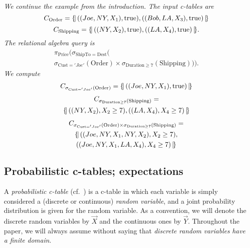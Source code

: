 \begin{example}\em
We continue the example from the introduction. The input c-tables are
\[
C_{\mathrm{Order}} = \{\!|\, ((Joe, NY, X_1), \mbox{true}),
((Bob, LA, X_3), \mbox{true}) \,|\!\}
\]
\[
C_{\mathrm{Shipping}} = \{\!|\, ((NY, X_2), \mbox{true}),
   ((LA, X_4), \mbox{true}) \,|\!\}.
\]
The relational algebra query is
\begin{multline*}
\pi_{\mathrm{Price}}(\sigma_{\mathrm{ShipTo} = \mathrm{Dest}}( \\
\sigma_{\mathrm{Cust}='Joe'}(\mathrm{Order}) \times
\sigma_{\mathrm{Duration} \ge 7}(\mathrm{Shipping}))).
\end{multline*}
%
We compute
\begin{multline*}
C_{\sigma_{\mathrm{Cust}='Joe'}(\mathrm{Order})} = \{\!|\, ((Joe, NY, X_1), \mbox{true})
\,|\!\}
\end{multline*}
\vspace*{-0.35in}
\begin{multline*}
C_{\sigma_{\mathrm{Duration} \ge 7}(\mathrm{Shipping})} =\\
\{\!|\, ((NY, X_2), X_2 \ge 7), ((LA, X_4),X_4 \ge 7) \,|\!\}
\end{multline*}
\vspace*{-0.35in}
\begin{multline*}
C_{\sigma_{\mathrm{Cust}='Joe'}(\mathrm{Order}) \times
\sigma_{\mathrm{Duration} \ge 7}(\mathrm{Shipping})} = \\
\{\!|\, ((Joe, NY, X_1, NY, X_2), X_2 \ge 7),\\
((Joe, NY, X_1, LA, X_4), 
X_4 \ge 7) \,|\!\}
\end{multline*}
\punto
\end{example}


\subsection{Probabilistic c-tables; expectations}
\label{sec:montecarlo}


A \textit{probabilistic  c-table} (cf.\ \cite{GT2006, KochMayBMS2008}) is a c-table in  which each variable is
simply considered a (discrete  or continuous) {\em random variable}\/,
and a joint probability distribution is given for the random variable.
As  a convention,  we will  denote  the discrete  random variables  by
$\vec{X}$ and the continuous ones by $\vec{Y}$.  Throughout the paper,
we  will  always  assume  without  saying that  {\em  discrete  random
variables have a finite domain}\/.


